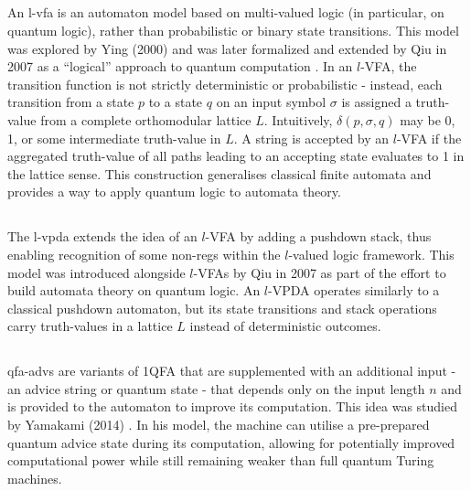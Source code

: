\subsection{} 
An \gls{l-vfa} is an automaton model based on multi-valued logic (in particular, on quantum logic), rather than probabilistic or binary state transitions. This model was explored by Ying (2000) and was later formalized and extended by Qiu in 2007 as a “logical” approach to quantum computation \cite{qiu2007automata}. In an $l$-VFA, the transition function is not strictly deterministic or probabilistic - instead, each transition from a state $p$ to a state $q$ on an input symbol $\sigma$ is assigned a truth-value from a complete orthomodular lattice $L$. Intuitively, $\delta(p,\sigma,q)$ may be 0, 1, or some intermediate truth-value in $L$. A string is accepted by an $l$-VFA if the aggregated truth-value of all paths leading to an accepting state evaluates to 1 in the lattice sense. This construction generalises classical finite automata and provides a way to apply quantum logic to automata theory.

\subsection{} 
The \gls{l-vpda} extends the idea of an $l$-VFA by adding a pushdown stack, thus enabling recognition of some non-\glspl{reg} within the $l$-valued logic framework. This model was introduced alongside $l$-VFAs by Qiu in 2007 \cite{qiu2007automata} as part of the effort to build automata theory on quantum logic. An $l$-VPDA operates similarly to a classical pushdown automaton, but its state transitions and stack operations carry truth-values in a lattice $L$ instead of deterministic outcomes.

\subsection{} 
\glspl{qfa-adv} are variants of 1QFA that are supplemented with an additional input - an advice string or quantum state - that depends only on the input length $n$ and is provided to the automaton to improve its computation. This idea was studied by Yamakami (2014) \cite{yamakami2014one}. In his model, the machine can utilise a pre-prepared quantum advice state during its computation, allowing for potentially improved computational power while still remaining weaker than full quantum Turing machines.


